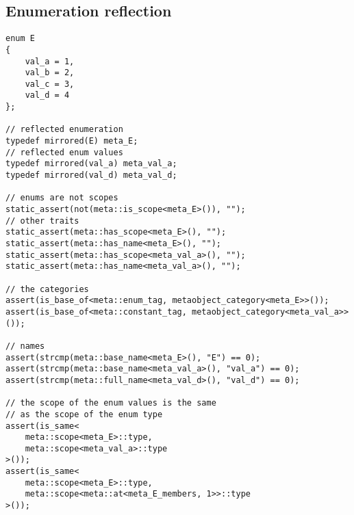 \subsection{Enumeration reflection}

\begin{verbatim}
enum E
{
	val_a = 1,
	val_b = 2,
	val_c = 3,
	val_d = 4
};

// reflected enumeration
typedef mirrored(E) meta_E;
// reflected enum values
typedef mirrored(val_a) meta_val_a;
typedef mirrored(val_d) meta_val_d;

// enums are not scopes
static_assert(not(meta::is_scope<meta_E>()), "");
// other traits
static_assert(meta::has_scope<meta_E>(), "");
static_assert(meta::has_name<meta_E>(), "");
static_assert(meta::has_scope<meta_val_a>(), "");
static_assert(meta::has_name<meta_val_a>(), "");

// the categories
assert(is_base_of<meta::enum_tag, metaobject_category<meta_E>>());
assert(is_base_of<meta::constant_tag, metaobject_category<meta_val_a>>());

// names
assert(strcmp(meta::base_name<meta_E>(), "E") == 0);
assert(strcmp(meta::base_name<meta_val_a>(), "val_a") == 0);
assert(strcmp(meta::full_name<meta_val_d>(), "val_d") == 0);

// the scope of the enum values is the same
// as the scope of the enum type
assert(is_same<
	meta::scope<meta_E>::type,
	meta::scope<meta_val_a>::type
>());
assert(is_same<
	meta::scope<meta_E>::type,
	meta::scope<meta::at<meta_E_members, 1>>::type
>());

\end{verbatim}
